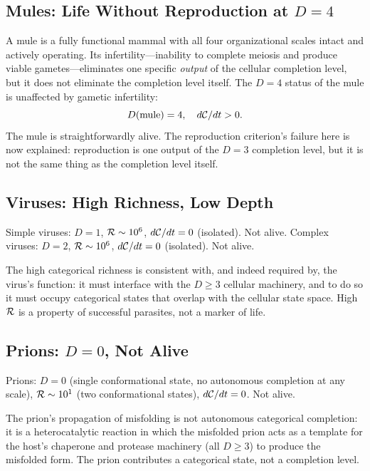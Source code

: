 \subsection{Mules: Life Without Reproduction at $D = 4$}

A mule is a fully functional mammal with all four organizational scales
intact and actively operating. Its infertility---inability to complete
meiosis and produce viable gametes---eliminates one specific \emph{output}
of the cellular completion level, but it does not eliminate the completion
level itself. The $D = 4$ status of the mule is unaffected by gametic
infertility:
\begin{equation}
  D(\text{mule}) = 4, \quad d\mathcal{C}/dt > 0.
  \label{eq:mule_classification}
\end{equation}
The mule is straightforwardly alive. The reproduction criterion's failure
here is now explained: reproduction is one output of the $D = 3$ completion
level, but it is not the same thing as the completion level itself.

\subsection{Viruses: High Richness, Low Depth}

Simple viruses: $D = 1$, $\mathcal{R} \sim 10^6$, $d\mathcal{C}/dt = 0$ (isolated). Not alive.
Complex viruses: $D = 2$, $\mathcal{R} \sim 10^6$, $d\mathcal{C}/dt = 0$ (isolated). Not alive.

The high categorical richness is consistent with, and indeed required by, the
virus's function: it must interface with the $D \geq 3$ cellular machinery, and
to do so it must occupy categorical states that overlap with the cellular state
space. High $\mathcal{R}$ is a property of successful parasites, not a marker of life.

\subsection{Prions: $D = 0$, Not Alive}

Prions: $D = 0$ (single conformational state, no autonomous completion at any
scale), $\mathcal{R} \sim 10^1$ (two conformational states), $d\mathcal{C}/dt = 0$. Not alive.

The prion's propagation of misfolding is not autonomous categorical completion:
it is a heterocatalytic reaction in which the misfolded prion acts as a template
for the host's chaperone and protease machinery (all $D \geq 3$) to produce the
misfolded form. The prion contributes a categorical state, not a completion level.

